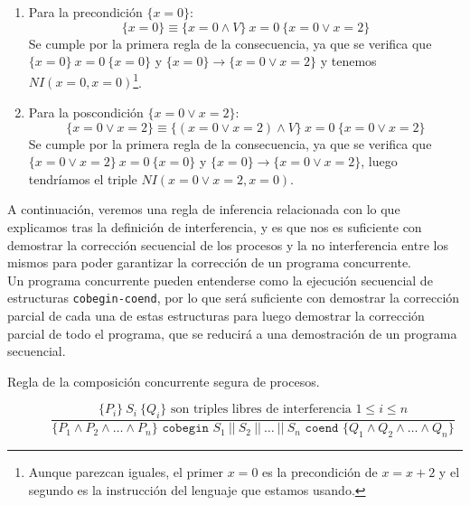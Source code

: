 \begin{ejemplo}
\begin{itemize}
            \begin{enumerate}
                \item Para la precondición $\{x=0\}$:
                    \begin{equation*}
                        \{x=0\} \equiv \{x=0 \land V\}\ x=0\ \{x=0 \lor x=2\}
                    \end{equation*}
                    Se cumple por la primera regla de la consecuencia, ya que se verifica que $\{x=0\}\ x=0\ \{x=0\}$ y $\{x=0\}\rightarrow \{x=0 \lor x=2\}$ y tenemos $NI(x=0, x=0)$\footnote{Aunque parezcan iguales, el primer $x=0$ es la precondición de $x=x+2$ y el segundo es la instrucción del lenguaje que estamos usando.}.
                \item Para la poscondición $\{x=0 \lor x=2\}$:
                    \begin{equation*}
                        \{x=0 \lor x = 2\} \equiv \{(x=0 \lor x=2)\land V\}\ x=0\ \{x=0 \lor x=2\}
                    \end{equation*}
                    Se cumple por la primera regla de la consecuencia, ya que se verifica que $\{x=0 \lor x=2\}\ x=0\ \{x=0\}$ y $\{x=0\}\rightarrow \{x=0 \lor x=2\}$, luego tendríamos el triple $NI(x=0 \lor x=2, x=0)$.
            \end{enumerate}
    \end{itemize}
\end{ejemplo}

A continuación, veremos una regla de inferencia relacionada con lo que explicamos tras la definición de interferencia, y es que nos es suficiente con demostrar la corrección secuencial de los procesos y la no interferencia entre los mismos para poder garantizar la corrección de un programa concurrente.\\
Un programa concurrente pueden entenderse como la ejecución secuencial de estructuras \texttt{cobegin-coend}, por lo que será suficiente con demostrar la corrección parcial de cada una de estas estructuras para luego demostrar la corrección parcial de todo el programa, que se reducirá a una demostración de un programa secuencial.

\begin{description}
    \item [Regla de la composición concurrente segura de procesos.] 
        \begin{equation*}
            \dfrac{\{P_i\}\ S_i\ \{Q_i\} \text{\ son\ triples\ libres\ de\ interferencia\ } 1\leq i \leq n}{\{P_1 \land P_2 \land \ldots \land P_n\} \texttt{\ cobegin\ } S_1\ ||\ S_2\ ||\ \ldots\ ||\ S_n \texttt{\ coend\ } \{Q_1 \land Q_2 \land \ldots \land Q_n\}}
        \end{equation*}
\end{description}

